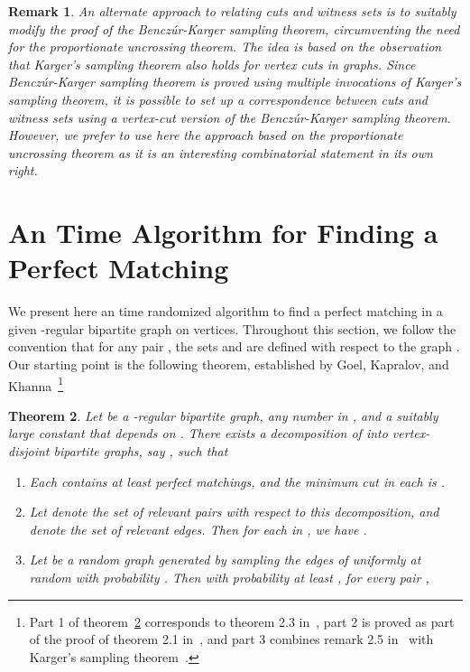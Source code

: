 \documentclass[11pt]{article}
\newtheorem{theorem}{Theorem}[section]
\newtheorem{remark}[theorem]{Remark}
\begin{document}
\begin{remark} \label{rm:other-approach}
An alternate approach to relating cuts and witness sets is to suitably
modify the proof of the
Bencz\'{u}r-Karger sampling theorem, circumventing the need for the
proportionate uncrossing
theorem. The idea is based on the observation that Karger's sampling
theorem also holds for
vertex cuts in graphs. Since Bencz\'{u}r-Karger sampling theorem is
proved using multiple
invocations of Karger's sampling theorem, it is possible to set up a
correspondence between
cuts and witness sets using a vertex-cut version of the
Bencz\'{u}r-Karger sampling theorem.
However, we prefer to use here the approach based on the proportionate
uncrossing theorem
as it is an interesting combinatorial statement in its own right.
\end{remark}


\section{An  Time Algorithm for Finding a Perfect Matching}
\label{sec:algo}

We present here an  time randomized algorithm to find a
perfect matching in a given -regular bipartite graph  on 
vertices.  Throughout this section, we follow the convention that for any pair
, the sets  and  are defined with respect to the graph
.  Our starting point is the following theorem, established by Goel,
Kapralov, and Khanna~\cite{gkk:rbp08}\footnote{Part 1 of
  theorem~\ref{thm:GKK09} corresponds to theorem 2.3 in~\cite{gkk:rbp08}, part
  2 is proved as part of the proof of theorem 2.1 in~\cite{gkk:rbp08}, and
  part 3 combines remark 2.5 in~\cite{gkk:rbp08} with Karger's sampling
  theorem~\cite{kar94a}.}

\begin{theorem}
\label{thm:GKK09}
Let  be a -regular bipartite graph,  any number in
, and  a suitably large constant that depends on
. There {\em exists} a decomposition of  into 
vertex-disjoint bipartite graphs, say , such that

\begin{enumerate}
\item
Each  contains at least  perfect matchings, and the minimum cut in each  is .

\item Let  denote the set of relevant pairs with respect to this
  decomposition, and  denote the set of relevant edges.  Then for each
   in , we have .

\item Let  be a random graph generated by sampling the edges of
   {\em uniformly} at random with probability .
  Then with probability at least , for every pair ,

\end{enumerate}
\end{theorem}
\end{document}
